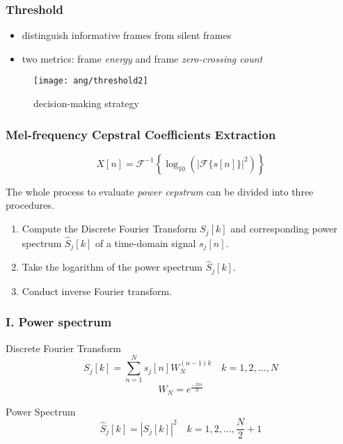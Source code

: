
\begin{frame}
\frametitle{Threshold}
\begin{itemize}
\item distinguish informative frames from silent frames
\item two metrics: frame \textit{energy} and frame \textit{zero-crossing count}
\end{itemize}

\begin{figure}[H]
\centering
\texttt{[image: ang/threshold2]}
\caption{decision-making strategy}
\end{figure}
\end{frame}


\begin{frame}
\frametitle{Mel-frequency Cepstral Coefficients Extraction}
\begin{equation}
X[n] = \mathcal{F}^{-1} \left\{\log_{10} \left( |\mathcal{F}\{s[n]\}|^2 \right) \right\}
\end{equation}
\vspace{10pt}

The whole process to evaluate \textit{power cepstrum} can be divided into three procedures.
\begin{enumerate}
\item Compute the Discrete Fourier Transform $S_j[k]$ and corresponding power spectrum $\hat{S}_j[k]$ of a time-domain signal $s_j[n]$.
\item Take the logarithm of the power spectrum $\hat{S}_j[k]$.
\item Conduct inverse Fourier transform.
\end{enumerate}
\end{frame}


\begin{frame}
\frametitle{I. Power spectrum}

Discrete Fourier Transform
\begin{equation}
S_j[k] = \sum_{n=1}^{N} s_j[n] W_N^{(n-1) k} \quad k = 1, 2, \dots, N
\end{equation}
\begin{equation}
W_N = e^{\frac{- 2\pi i}{N}}
\end{equation}

Power Spectrum
\begin{equation}
\hat{S}_j[k] = |S_j[k]|^2 \quad k = 1, 2, \dots, \frac{N}{2} + 1
\end{equation}
\end{frame}


